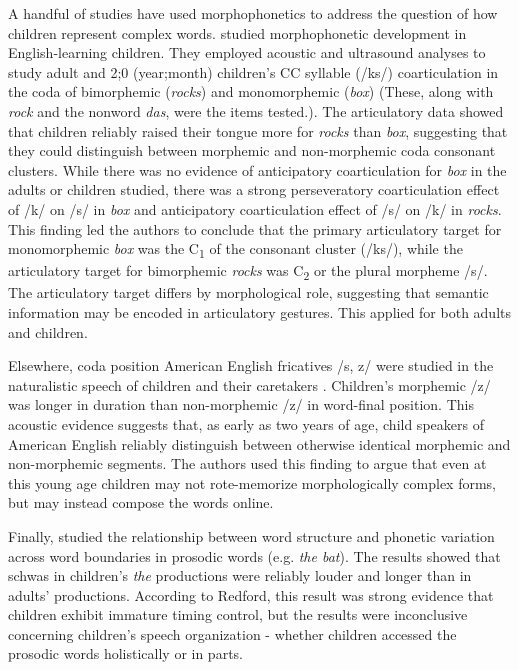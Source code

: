 \documentclass[a4paper,man,floatsintext,natbib,donotrepeattitle, apacite]{apa6}
\begin{document}
A handful of studies have used morphophonetics to address the question of how children represent complex words. \citet{songEffectsCoarticulationMorphological2013} studied morphophonetic development in English-learning children. They employed acoustic and ultrasound analyses to study adult and 2;0 (year;month) children’s CC syllable (/ks/) coarticulation in the coda of bimorphemic (\textit{rocks}) and monomorphemic (\textit{box}) (These, along with \textit{rock} and the nonword \textit{das}, were the items tested.). The articulatory data showed that children reliably raised their tongue more for \textit{rocks} than \textit{box}, suggesting that they could distinguish between morphemic and non-morphemic coda consonant clusters. While there was no evidence of anticipatory coarticulation for \textit{box} in the adults or children studied, there was a strong perseveratory coarticulation effect of /k/ on /s/ in \textit{box} and anticipatory coarticulation effect of /s/ on /k/ in \textit{rocks}. This finding led the authors to conclude that the primary articulatory target for monomorphemic \textit{box} was the C\textsubscript{1} of the consonant cluster (/ks/), while the articulatory target for bimorphemic \textit{rocks} was C\textsubscript{2} or the plural morpheme /s/. The articulatory target differs by morphological role, suggesting that semantic information may be encoded in articulatory gestures. This applied for both adults and children.

Elsewhere, coda position American English fricatives /s, z/ were studied in the naturalistic speech of children and their caretakers \citep{songDurationalCuesFricative2013}. Children’s morphemic /z/ was longer in duration than non-morphemic /z/ in word-final position. This acoustic evidence suggests that, as early as two years of age, child speakers of American English reliably distinguish between otherwise identical morphemic and non-morphemic segments. The authors used this finding to argue that even at this young age children may not rote-memorize morphologically complex forms, but may instead compose the words online.

Finally, \citet{redfordGrammaticalWordProduction2018} studied the relationship between word structure and phonetic variation across word boundaries in prosodic words (e.g. \textit{the bat}). The results showed that schwas in children's \textit{the} productions were reliably louder and longer than in adults' productions. According to Redford, this result was strong evidence that children exhibit immature timing control, but the results were inconclusive concerning children's speech organization - whether children accessed the prosodic words holistically or in parts.
\end{document}
